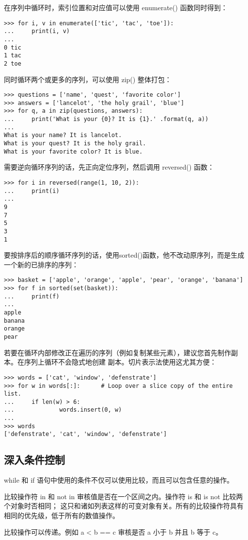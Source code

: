 \documentclass[UTF8]{ctexart}
\begin{document}
在序列中循环时，索引位置和对应值可以使用 enumerate() 函数同时得到：
\begin{verbatim}
>>> for i, v in enumerate(['tic', 'tac', 'toe']):
...     print(i, v)
...
0 tic
1 tac
2 toe
\end{verbatim}

同时循环两个或更多的序列，可以使用 zip() 整体打包：
\begin{verbatim}
>>> questions = ['name', 'quest', 'favorite color']
>>> answers = ['lancelot', 'the holy grail', 'blue']
>>> for q, a in zip(questions, answers):
...     print('What is your {0}? It is {1}.' .format(q, a))
...
What is your name? It is lancelot.
What is your quest? It is the holy grail.
What is your favorite color? It is blue.
\end{verbatim}

需要逆向循环序列的话，先正向定位序列，然后调用 reversed() 函数：
\begin{verbatim}
>>> for i in reversed(range(1, 10, 2)):
...     print(i)
...
9
7
5
3
1
\end{verbatim}

要按排序后的顺序循环序列的话，使用sorted()函数，他不改动原序列，而是生成一个新的已排序的序列：
\begin{verbatim}
>>> basket = ['apple', 'orange', 'apple', 'pear', 'orange', 'banana']
>>> for f in sorted(set(basket)):
...     print(f)
...
apple
banana
orange
pear
\end{verbatim}

若要在循环内部修改正在遍历的序列（例如复制某些元素），建议您首先制作副本。在序列上循环不会隐式地创建
副本。切片表示法使用这尤其方便：
\begin{verbatim}
>>> words = ['cat', 'window', 'defenstrate']
>>> for w in words[:]:      # Loop over a slice copy of the entire list.
...     if len(w) > 6:
...             words.insert(0, w)
...
>>> words
['defenstrate', 'cat', 'window', 'defenstrate']
\end{verbatim}

\subsection{深入条件控制}
while 和 if 语句中使用的条件不仅可以使用比较，而且可以包含任意的操作。

比较操作符 in 和 not in 审核值是否在一个区间之内。操作符 is 和 is not 比较两个对象时否相同；
这只和诸如列表这样的可变对象有关。所有的比较操作符具有相同的优先级，低于所有的数值操作。

比较操作可以传递。例如 a < b == c 审核是否 a 小于 b 并且 b 等于 c。
\end{document}
